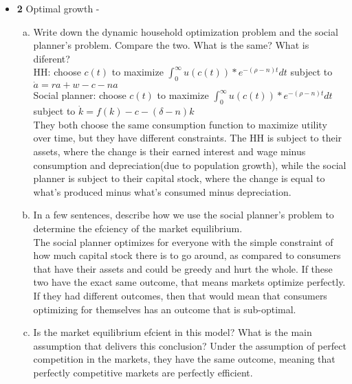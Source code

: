\documentclass[11pt]{article}
\begin{document}
\begin{itemize}
\item \textbf{2} 
Optimal growth -
\begin{enumerate}[(a)]
\item Write down the dynamic household optimization problem and the social planner's
problem. Compare the two. What is the same? What is diferent?
\\HH: choose $c(t)$ to maximize $\int_0^\infty u(c(t))*e^{-(\rho-n)t} dt$ subject to $\dot a = ra +w -c -na$
\\Social planner: choose $c(t)$ to maximize $\int_0^\infty u(c(t))*e^{-(\rho-n)t} dt$ subject to $\dot k = f(k) -c - (\delta-n)k$
\\They both choose the same consumption function to maximize utility over time, but they have different constraints. The HH is subject to their assets, where the change is their earned interest and wage minus consumption and depreciation(due to population growth), while the social planner is subject to their capital stock, where the change is equal to what's produced minus what's consumed minus depreciation.
\item In a few sentences, describe how we use the social planner's problem to determine
the efciency of the market equilibrium.
\\The social planner optimizes for everyone with the simple constraint of how much capital stock there is to go around, as compared to consumers that have their assets and could be greedy and hurt the whole. If these two have the exact same outcome, that means markets optimize perfectly. If they had different outcomes, then that would mean that consumers optimizing for themselves has an outcome that is sub-optimal.
\item Is the market equilibrium efcient in this model? What is the main assumption
that delivers this conclusion?
Under the assumption of perfect competition in the markets, they have the same outcome, meaning that perfectly competitive markets are perfectly efficient.
\end{enumerate}



\end{itemize}
\end{document}
